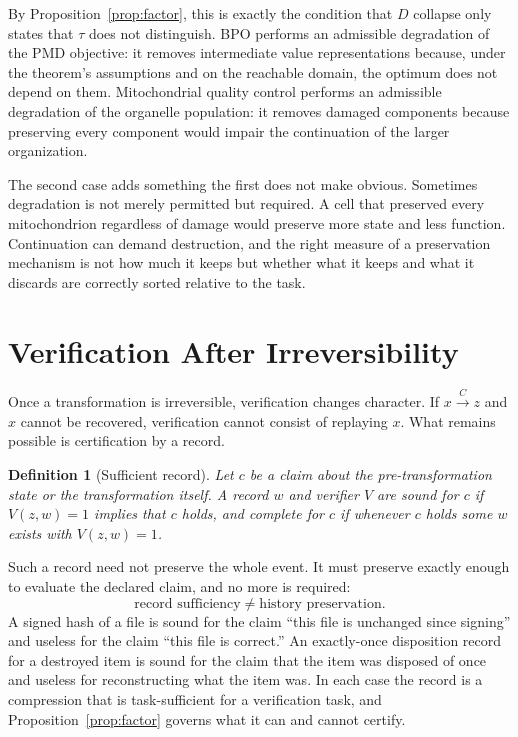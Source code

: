 \documentclass[11pt]{article}
\newtheorem{definition}{Definition}
\theoremstyle{remark}
\begin{document}
By Proposition~\ref{prop:factor}, this is exactly the condition that $D$ collapse only states that $\tau$ does not distinguish. BPO performs an admissible degradation of the PMD objective: it removes intermediate value representations because, under the theorem's assumptions and on the reachable domain, the optimum does not depend on them. Mitochondrial quality control performs an admissible degradation of the organelle population: it removes damaged components because preserving every component would impair the continuation of the larger organization.

The second case adds something the first does not make obvious. Sometimes degradation is not merely permitted but required. A cell that preserved every mitochondrion regardless of damage would preserve more state and less function. Continuation can demand destruction, and the right measure of a preservation mechanism is not how much it keeps but whether what it keeps and what it discards are correctly sorted relative to the task.

\section{Verification After Irreversibility}

Once a transformation is irreversible, verification changes character. If $x\xrightarrow{C}z$ and $x$ cannot be recovered, verification cannot consist of replaying $x$. What remains possible is certification by a record.

\begin{definition}[Sufficient record]
Let $c$ be a claim about the pre-transformation state or the transformation itself. A record $w$ and verifier $V$ are \emph{sound} for $c$ if $V(z,w)=1$ implies that $c$ holds, and \emph{complete} for $c$ if whenever $c$ holds some $w$ exists with $V(z,w)=1$.
\end{definition}

Such a record need not preserve the whole event. It must preserve exactly enough to evaluate the declared claim, and no more is required:
\[
\text{record sufficiency} \neq \text{history preservation}.
\]
A signed hash of a file is sound for the claim ``this file is unchanged since signing'' and useless for the claim ``this file is correct.'' An exactly-once disposition record for a destroyed item is sound for the claim that the item was disposed of once and useless for reconstructing what the item was. In each case the record is a compression that is task-sufficient for a verification task, and Proposition~\ref{prop:factor} governs what it can and cannot certify.
\end{document}
